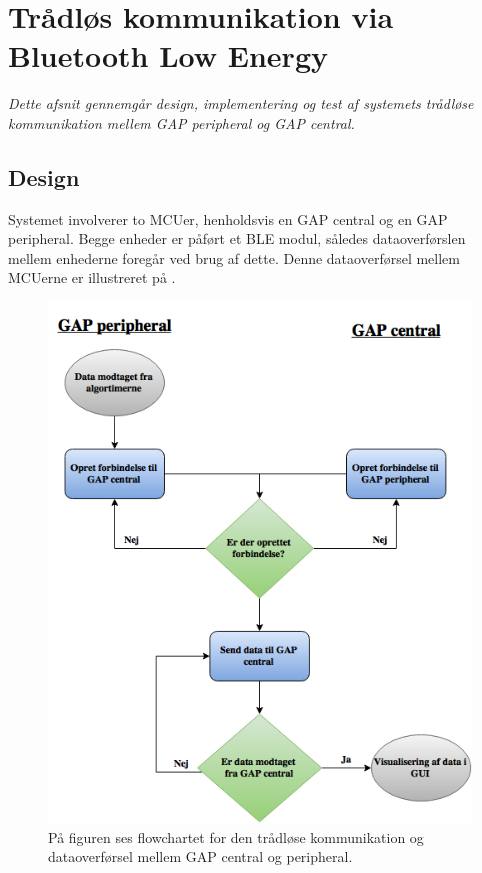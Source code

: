 \section{Trådløs kommunikation via Bluetooth Low Energy}
\textit{Dette afsnit gennemgår design, implementering og test af systemets trådløse kommunikation mellem GAP peripheral og GAP central.}

\subsection{Design}
Systemet involverer to MCUer, henholdsvis en GAP central og en GAP peripheral. Begge enheder er påført et BLE modul, således dataoverførslen mellem enhederne foregår ved brug af dette. Denne dataoverførsel mellem MCUerne er illustreret på . 
\begin{figure}[H]
	\centering
	\includegraphics[scale=0.5]{figures/cDesign/blue_pseudo.png}
	\caption{På figuren ses flowchartet for den trådløse kommunikation og dataoverførsel mellem GAP central og peripheral.}
	\label{fig:blue_pseudo}
\end{figure}\vspace{-.25cm}
